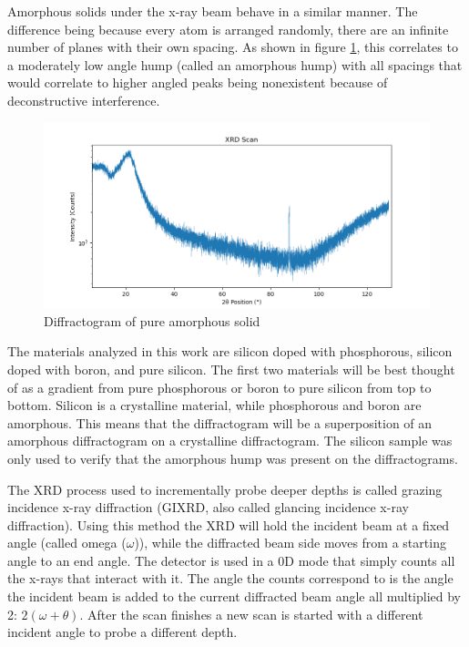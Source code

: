 \documentclass{article}
\begin{document}
\begin{multicols}{2}
    Amorphous solids under the x-ray beam behave in a similar manner. 
    The difference being because every atom is arranged randomly, there are an infinite number of planes with their own spacing. 
    As shown in figure \ref{fig:pure amorphous XRD scan}, this correlates to a moderately low angle hump (called an amorphous hump) with all spacings that would correlate to higher angled peaks being nonexistent because of deconstructive interference\citep{PARKS2007277,achilles_amorphous_2018,ma18092093}.

\begin{figure}[H]
    \centering
    \includegraphics[width=1\linewidth]{amorphous XRD scan.png}
    \caption{Diffractogram of pure amorphous solid}
    \label{fig:pure amorphous XRD scan}
\end{figure}

    The materials analyzed in this work are silicon doped with phosphorous, silicon doped with boron, and pure silicon. 
    The first two materials will be best thought of as a gradient from pure phosphorous or boron to pure silicon from top to bottom. 
    Silicon is a crystalline material, while phosphorous and boron are amorphous. 
    This means that the diffractogram will be a superposition of an amorphous diffractogram on a crystalline diffractogram. 
    The silicon sample was only used to verify that the amorphous hump was present on the diffractograms.

    The XRD process used to incrementally probe deeper depths is called grazing incidence x-ray diffraction (GIXRD, also called glancing incidence x-ray diffraction). 
    Using this method the XRD will hold the incident beam at a fixed angle (called omega ($\omega$)), while the diffracted beam side moves from a starting angle to an end angle. 
    The detector is used in a 0D mode that simply counts all the x-rays that interact with it. 
    The angle the counts correspond to is the angle the incident beam is added to the current diffracted beam angle all multiplied by 2: $2(\omega+\theta)$. 
    After the scan finishes a new scan is started with a different incident angle to probe a different depth.


\end{multicols}
\end{document}
